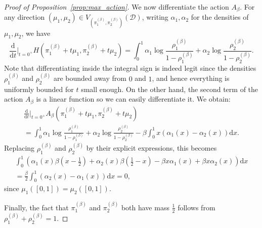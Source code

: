\documentclass[a4paper,11pt]{amsart}
\theoremstyle{definition}
\begin{document}
\begin{proof}[Proof of Proposition~\ref{prop:max_action}]
    We now differentiate the action $A_{\beta}$. For any direction $(\mu_1, \mu_2) \in V_{(\pi_1^{(\beta)}, \pi_2^{(\beta)})}(\mathcal{D})$, writing $\alpha_1, \alpha_2$ for the densities of $\mu_1, \mu_2$, we have
    \[ \frac{\mathrm{d}}{\mathrm{d}t}\Big|_{t=0^+} H \left( \pi_1^{(\beta)}+t\mu_1, \pi_2^{(\beta)}+t\mu_2 \right)= \int_0^1 \alpha_1 \log \frac{\rho_1^{(\beta)}}{1-\rho_1^{(\beta)}} + \alpha_2 \log \frac{\rho_2^{(\beta)}}{1-\rho_2^{(\beta)}}. \]
    Note that differentiating inside the integral sign is indeed legit since the densities $\rho_1^{(\beta)}$ and $\rho^{(\beta)}_2$ are bounded away from $0$ and $1$, and hence everything is uniformly bounded for $t$ small enough.
    On the other hand, the second term of the action $A_{\beta}$ is a linear function so we can easily differentiate it. 
    We obtain:
    \begin{multline}\label{eqn:derivative_action}
        \frac{\mathrm{d}}{\mathrm{d}t}\Big|_{t=0^+} A_{\beta} \left( \pi_1^{(\beta)}+t\mu_1, \pi_2^{(\beta)}+t\mu_2 \right) \\= \int_0^1 \alpha_1 \log \frac{\rho_1^{(\beta)}}{1-\rho_1^{(\beta)}} + \alpha_2 \log \frac{\rho_2^{(\beta)}}{1-\rho_2^{(\beta)}} -\beta \int_0^1 x \left( \alpha_1(x)-\alpha_2(x) \right) \mathrm{d}x.
    \end{multline}
    Replacing $\rho_1^{(\beta)}$ and $\rho_2^{(\beta)}$ by their explicit expressions, this becomes
    \begin{multline*}
        \int_0^1 \left( \alpha_1(x) \beta \left( x-\frac{1}{2} \right) + \alpha_2(x) \beta \left( \frac{1}{2}-x \right) - \beta x \alpha_1(x) + \beta x \alpha_2(x) \right) \mathrm{d}x \\
        = \frac{\beta}{2} \int_0^1 \left( \alpha_2(x) - \alpha_1(x) \right) \mathrm{d}x
        = 0 ,
    \end{multline*}
    since $\mu_1([0,1])=\mu_2([0,1])$.
    
    Finally, the fact that $\pi_1^{(\beta)}$ and $\pi_2^{(\beta)}$ both have mass $\frac{1}{2}$ follows from $\rho_1^{(\beta)}+\rho_2^{(\beta)}=1$.
\end{proof}
\end{document}
